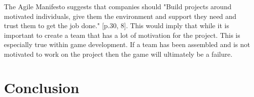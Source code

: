 \documentclass{scrartcl}
\begin{document}
The Agile Manifesto suggests that companies should "Build projects around motivated individuals, give them the environment and support they need and trust them to get the job done." [p.30, 8]. This would imply that while it is important to create a team that has a lot of motivation for the project. This is especially true within game development. If a team has been assembled and is not motivated to work on the project then the game will ultimately be a failure.

\section{Conclusion}





\end{document}
